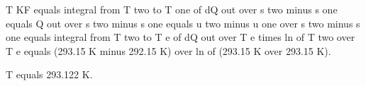 T KF equals integral from T two to T one of dQ out over s two minus s one equals Q out over s two minus s one equals u two minus u one over s two minus s one equals integral from T two to T e of dQ out over T e times ln of T two over T e equals (293.15 K minus 292.15 K) over ln of (293.15 K over 293.15 K).

T equals 293.122 K.